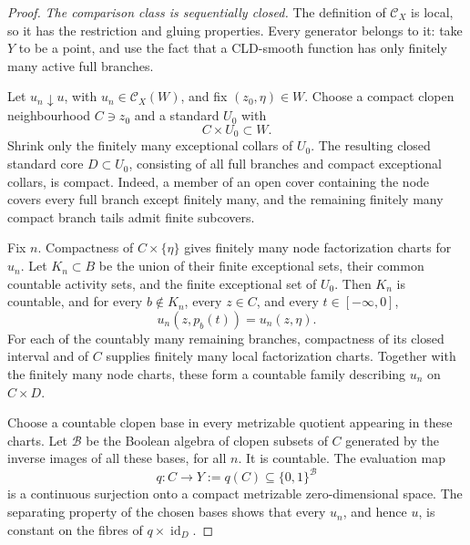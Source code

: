 \begin{proof}
\medskip\noindent
\emph{The comparison class is sequentially closed.}
The definition of \(\mathcal C_X\) is local, so it has the restriction
and gluing properties.  Every generator belongs to it: take \(Y\) to be
a point, and use the fact that a CLD-smooth function has only finitely
many active full branches.

Let \(u_n\downarrow u\), with \(u_n\in\mathcal C_X(W)\), and fix
\((z_0,\eta)\in W\).  Choose a compact clopen neighbourhood
\(C\ni z_0\) and a standard \(U_0\) with
\[
                              C\times U_0\subset W.
\]
Shrink only the finitely many exceptional collars of \(U_0\).  The
resulting closed standard core \(D\subset U_0\), consisting of all full
branches and compact exceptional collars, is compact.  Indeed, a member
of an open cover containing the node covers every full branch except
finitely many, and the remaining finitely many compact branch tails
admit finite subcovers.

Fix \(n\).  Compactness of \(C\times\{\eta\}\) gives finitely many node
factorization charts for \(u_n\).  Let \(K_n\subset B\) be the union of
their finite exceptional sets, their common countable activity sets,
and the finite exceptional set of \(U_0\).  Then \(K_n\) is countable,
and for every \(b\notin K_n\), every \(z\in C\), and every
\(t\in[-\infty,0]\),
\begin{equation}
                       u_n(z,p_b(t))=u_n(z,\eta).
 \label{eq:p071-stone-infinite-limit-inactive}
\end{equation}
For each of the countably many remaining branches, compactness of its
closed interval and of \(C\) supplies finitely many local factorization
charts.  Together with the finitely many node charts, these form a
countable family describing \(u_n\) on \(C\times D\).

Choose a countable clopen base in every metrizable quotient appearing in
these charts.  Let \(\mathcal B\) be the Boolean algebra of clopen
subsets of \(C\) generated by the inverse images of all these bases, for
all \(n\).  It is countable.  The evaluation map
\begin{equation}
 q:C\longrightarrow
 Y:=q(C)\subseteq\{0,1\}^{\mathcal B}
 \label{eq:p071-stone-infinite-common-quotient}
\end{equation}
is a continuous surjection onto a compact metrizable
zero-dimensional space.  The separating property of the chosen bases
shows that every \(u_n\), and hence \(u\), is constant on the fibres of
\(q\times\operatorname{id}_D\).


\end{proof}
